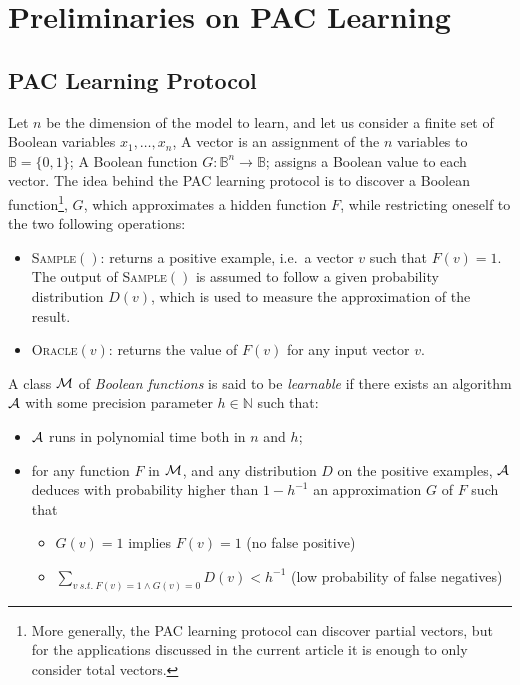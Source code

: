 \documentclass{llncs}
\begin{document}
\section{Preliminaries on PAC Learning}\label{pac}

\subsection{PAC Learning Protocol}

Let $n$ be the dimension of the model to learn, and let us consider a finite set of Boolean variables $x_1,\ldots,x_n$,
 A vector is an assignment of the $n$ variables to  $\mathbb{B} = \{0,1\}$;
 A Boolean function $G:{\mathbb{B}}^n \rightarrow \mathbb{B}$;
	assigns a Boolean value to each vector.
The idea behind the PAC learning protocol is to discover a Boolean
function\footnote{More generally, the PAC learning protocol can discover
partial vectors, but for the applications discussed in the
current article it is enough to only consider total vectors.}, $G$, which approximates a hidden function $F$, while restricting oneself to the two following operations:
\begin{itemize}
  \item
\textsc{Sample}$()$: returns a positive example, i.e.~a vector $v$ such that $F(v)=1$.
The output of \textsc{Sample}$()$ is assumed to follow a given probability distribution $D(v)$, which is used to measure the approximation of the result.
  \item
\textsc{Oracle}$(v)$: returns the value of $F(v)$ for any input vector $v$.
\end{itemize}


\begin{definition}\label{def:learnclass}
   A class $\cal M$ of \emph{Boolean functions} is said to be \emph{learnable}
   if there exists an algorithm $\cal A$ with some precision parameter $h\in\mathbb N$ such that:
   \begin{itemize}
      \item $\cal A$ runs in polynomial time both in $n$ and $h$;
      \item
         for any function $F$ in $\cal M$, and any distribution $D$ on the positive examples,
         $\cal A$ deduces with probability higher than $1-h^{-1}$ an approximation $G$ of $F$ such that
         \begin{itemize}
            \item $G(v)=1$ implies $F(v)=1$ (no false positive)
            \item
               $\displaystyle\sum_{v\ s.t.\ F(v)=1\wedge G(v)=0} D(v) < h^{-1}$ (low probability of false negatives)
         \end{itemize}
   \end{itemize}
\end{definition}
\end{document}
